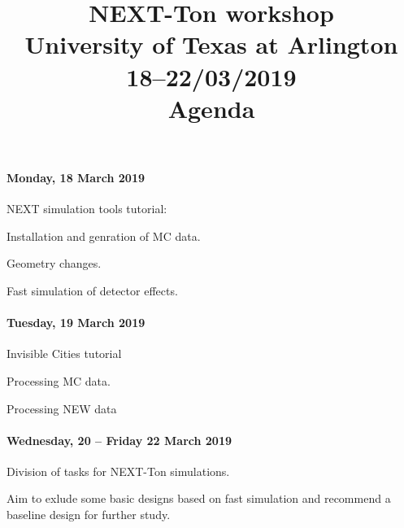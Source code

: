 \documentclass{article}
\title{NEXT-Ton workshop\\ University of Texas at Arlington\\ 18--22/03/2019\\ Agenda}
\begin{document}
\maketitle

\paragraph{Monday, 18 March 2019}

NEXT simulation tools tutorial:

Installation and genration of MC data.

Geometry changes.

Fast simulation of detector effects.

\paragraph{Tuesday, 19 March 2019}

Invisible Cities tutorial

Processing MC data.

Processing NEW data

\paragraph{Wednesday, 20 -- Friday 22 March 2019}

Division of tasks for NEXT-Ton simulations.

Aim to exlude some basic designs based on fast simulation and recommend a baseline design for further study.
\end{document}
